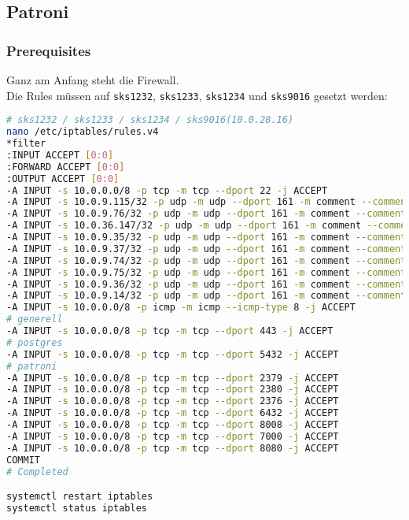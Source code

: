 
\subsection{Patroni}
\label{subsec:evaluation_installation_patroni}
\subsubsection{Prerequisites}
Ganz am Anfang steht die Firewall.\\
Die Rules müssen auf \texttt{sks1232}, \texttt{sks1233}, \texttt{sks1234} und \texttt{sks9016} gesetzt werden:
\lstset{style=gra_codestyle}
\begin{lstlisting}[language=bash, caption=Patroni - Firewall Settings,captionpos=b,label={lst:patroni-firewall-settings},breaklines=true]
# sks1232 / sks1233 / sks1234 / sks9016(10.0.28.16)
nano /etc/iptables/rules.v4
*filter
:INPUT ACCEPT [0:0]
:FORWARD ACCEPT [0:0]
:OUTPUT ACCEPT [0:0]
-A INPUT -s 10.0.0.0/8 -p tcp -m tcp --dport 22 -j ACCEPT
-A INPUT -s 10.0.9.115/32 -p udp -m udp --dport 161 -m comment --comment "Allow SNMP for probe 10.0.9.115" -j ACCEPT
-A INPUT -s 10.0.9.76/32 -p udp -m udp --dport 161 -m comment --comment "Allow SNMP for probe 10.0.9.76" -j ACCEPT
-A INPUT -s 10.0.36.147/32 -p udp -m udp --dport 161 -m comment --comment "Allow SNMP for probe 10.0.36.147" -j ACCEPT
-A INPUT -s 10.0.9.35/32 -p udp -m udp --dport 161 -m comment --comment "Allow SNMP for probe 10.0.9.35" -j ACCEPT
-A INPUT -s 10.0.9.37/32 -p udp -m udp --dport 161 -m comment --comment "Allow SNMP for probe 10.0.9.37" -j ACCEPT
-A INPUT -s 10.0.9.74/32 -p udp -m udp --dport 161 -m comment --comment "Allow SNMP for probe 10.0.9.74" -j ACCEPT
-A INPUT -s 10.0.9.75/32 -p udp -m udp --dport 161 -m comment --comment "Allow SNMP for probe 10.0.9.75" -j ACCEPT
-A INPUT -s 10.0.9.36/32 -p udp -m udp --dport 161 -m comment --comment "Allow SNMP for probe 10.0.9.36" -j ACCEPT
-A INPUT -s 10.0.9.14/32 -p udp -m udp --dport 161 -m comment --comment "Allow SNMP for probe 10.0.9.14" -j ACCEPT
-A INPUT -s 10.0.0.0/8 -p icmp -m icmp --icmp-type 8 -j ACCEPT
# generell
-A INPUT -s 10.0.0.0/8 -p tcp -m tcp --dport 443 -j ACCEPT
# postgres
-A INPUT -s 10.0.0.0/8 -p tcp -m tcp --dport 5432 -j ACCEPT
# patroni
-A INPUT -s 10.0.0.0/8 -p tcp -m tcp --dport 2379 -j ACCEPT
-A INPUT -s 10.0.0.0/8 -p tcp -m tcp --dport 2380 -j ACCEPT
-A INPUT -s 10.0.0.0/8 -p tcp -m tcp --dport 2376 -j ACCEPT
-A INPUT -s 10.0.0.0/8 -p tcp -m tcp --dport 6432 -j ACCEPT
-A INPUT -s 10.0.0.0/8 -p tcp -m tcp --dport 8008 -j ACCEPT
-A INPUT -s 10.0.0.0/8 -p tcp -m tcp --dport 7000 -j ACCEPT
-A INPUT -s 10.0.0.0/8 -p tcp -m tcp --dport 8080 -j ACCEPT
COMMIT
# Completed

systemctl restart iptables
systemctl status iptables
\end{lstlisting}

